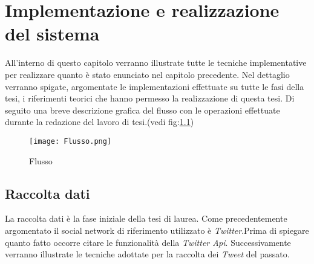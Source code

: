 \chapter{Implementazione e realizzazione del sistema}
\label{capitolo5}
\thispagestyle{empty}



\noindent All'interno di questo capitolo verranno illustrate tutte le tecniche implementative per realizzare quanto è stato enunciato nel capitolo precedente. Nel dettaglio verranno spigate, argomentate le implementazioni effettuate su tutte le fasi della tesi, i riferimenti teorici che hanno permesso la realizzazione di questa tesi. Di seguito una breve descrizione grafica del flusso con le operazioni effettuate durante la redazione del lavoro di tesi.(vedi fig:\ref{Flusso})
\begin{figure}[h!]
    \begin{center}
      \texttt{[image: Flusso.png]}
	\caption{Flusso}
	\label{Flusso}
    \end{center}
  \end{figure}

\section{Raccolta dati}
\label{raccolta}
La raccolta dati è la fase iniziale della tesi di laurea. Come precedentemente argomentato il social network di riferimento utilizzato è \textit{Twitter}.Prima di spiegare quanto fatto occorre citare le funzionalità della \textit{Twitter Api}. Successivamente verranno illustrate le tecniche adottate per la raccolta dei \textit{Tweet} del passato.
